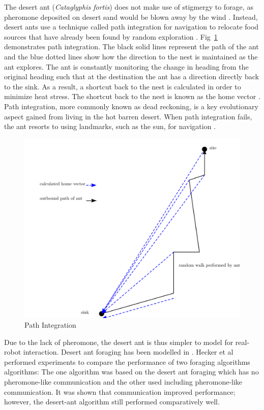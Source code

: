 The desert ant (\textit{Cataglyphis fortis}) does not make use of stigmergy to forage, as pheromone deposited on desert sand would be blown away by the wind \cite{collett1992visual}. Instead, desert ants use a technique called path integration for navigation to relocate food sources that have already been found by random exploration \cite{collett1998local,wehner2003desert}. Fig~\ref{pathintegration} demonstrates path integration. The black solid lines represent the path of the ant and the blue dotted lines show how the direction to the nest is maintained as the ant explores. The ant is constantly monitoring the change in heading from the original heading such that at the destination the ant has a direction directly back to the sink. As a result, a shortcut back to the nest is calculated in order to minimize heat stress. The shortcut back to the nest is known as the home vector \cite{muller1988path}. Path integration, more commonly known as dead reckoning, is a key evolutionary aspect gained from living in the hot barren desert. When path integration fails, the ant resorts to using landmarks, such as the sun, for navigation \cite{collett1998local}.

\begin{figure} [h]
	\centering
	\includegraphics[width=\textwidth]{chapters/chapter2/figures/drawing.png}
	\caption{Path Integration }
	\label{pathintegration}
\end{figure}

Due to the lack of pheromone, the desert ant is thus simpler to model for real-robot interaction. Desert ant foraging has been modelled in \cite{moller1998modeling,hecker2012formica}. Hecker et al \cite{hecker2012formica} performed experiments to compare the performance of two foraging algorithms algorithms: The one algorithm was based on the desert ant foraging which has no pheromone-like communication and the other used including pheromone-like communication. It was shown that communication improved performance; however, the desert-ant algorithm still performed comparatively well. 

